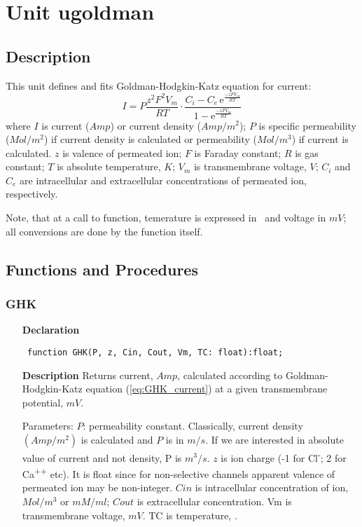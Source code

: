 \documentclass[12pt,a4paper,oneside]{report}
\newcommand{\lmath}[1]{   %
	\marginpar{\vspace{#1} 
		\begin{flushright}
			LMath
	\end{flushright} }
}
\newcommand{\euler}{\mathrm{e}}
\newcommand{\declarationitem}[1]{\textbf{#1}}
\newcommand{\descriptiontitle}[1]{\textbf{#1}}
\newcommand{\code}[1]{\texttt{#1}}
\begin{document}
\section{Unit ugoldman}\lmath{-24pt}
\label{ugoldman}
\subsection{Description}
This unit defines and fits Goldman-Hodgkin-Katz equation for current:
\begin{equation}\label{eq:GHK_current}
I=P\dfrac{z^2F^2V_m}{RT}\cdot\dfrac{{C_i}-{C_e}\,\euler^{\frac{-zFV_m}{RT}}}{1-\euler^{\frac{-zFV_m}{RT}}}
\end{equation}
where $I$ is current ($Amp$) or current density ($Amp/m^2$); $P$ is specific permeability ($Mol/m^2$) if current density is calculated or permeability ($Mol/m^3$) if current is calculated. $z$ is valence of permeated ion; $F$ is Faraday constant; $R$ is gas constant; $T$ is absolute temperature, $K$; $V_m$ is transmembrane voltage, $V$; $C_{i}$ and $C_{e}$ are intracellular and extracellular concentrations of permeated ion, respectively.

Note, that at a call to function, temerature is expressed in \celsius\ and voltage in $mV$; all conversions are done by the function itself.   
\subsection{Functions and Procedures}
\subsubsection{GHK}
\label{ugoldman-GHK}
\begin{itemize}\item[\declarationitem{Declaration}\hfill]
	\begin{flushleft}
		\code{
			function GHK(P, z, Cin, Cout, Vm, TC: float):float;}
		
	\end{flushleft}
	
	\par
	\item[\descriptiontitle{Description}]
	Returns current, $Amp$, calculated according to Goldman-Hodgkin-Katz equation (\ref{eq:GHK_current}) at a given transmembrane potential, $mV$. 
	
	Parameters: $P$: permeability constant. Classically, current density $(Amp/m^2)$ is calculated and $P$ is in $m/s$. If we are interested in absolute value of current and not density, P is $m^3/s$. $z$ is ion charge (-1 for Cl\textsuperscript{-}; 2 for Ca\textsuperscript{++} etc). It is float since for non-selective channels apparent valence of permeated ion may be non-integer. $Cin$ is intracellular concentration of ion, $Mol/m^3$ or $mM/ml$; $Cout$ is extracellular concentration. Vm is transmembrane voltage, $mV$. TC is temperature, \celsius.
	
\end{itemize}
\end{document}
